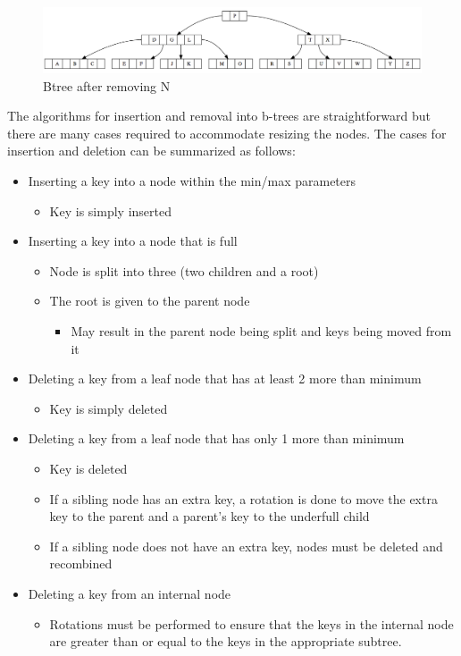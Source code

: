 \begin{figure}[H]
\centering
\includegraphics[width=\textwidth]{pictures/btree4.png}
\caption{Btree after removing N}
\label{fig:btree4}
\end{figure}


The algorithms for insertion and removal into b-trees are straightforward but there are many cases required to accommodate resizing the nodes. The cases for insertion and deletion can be summarized as follows:
\begin{itemize}
	\item Inserting a key into a node within the min/max parameters
\begin{itemize}
	\item Key is simply inserted
\end{itemize}
	\item Inserting a key into a node that is full
\begin{itemize}
	\item Node is split into three (two children and a root)
	\item The root is given to the parent node
\begin{itemize}
	\item May result in the parent node being split and keys being moved from it
\end{itemize}
\end{itemize}
	\item Deleting a key from a leaf node that has at least 2 more than minimum
\begin{itemize}
	\item Key is simply deleted
\end{itemize}
	\item Deleting a key from a leaf node that has only 1 more than minimum
\begin{itemize}
	\item Key is deleted
	\item If a sibling node has an extra key, a rotation is done to move the extra key to the parent and a parent’s key to the underfull child
	\item If a sibling node does not have an extra key, nodes must be deleted and recombined
\end{itemize}
	\item Deleting a key from an internal node
\begin{itemize}
	\item Rotations must be performed to ensure that the keys in the internal node are greater than or equal to the keys in the appropriate subtree.
\end{itemize}
\end{itemize}


